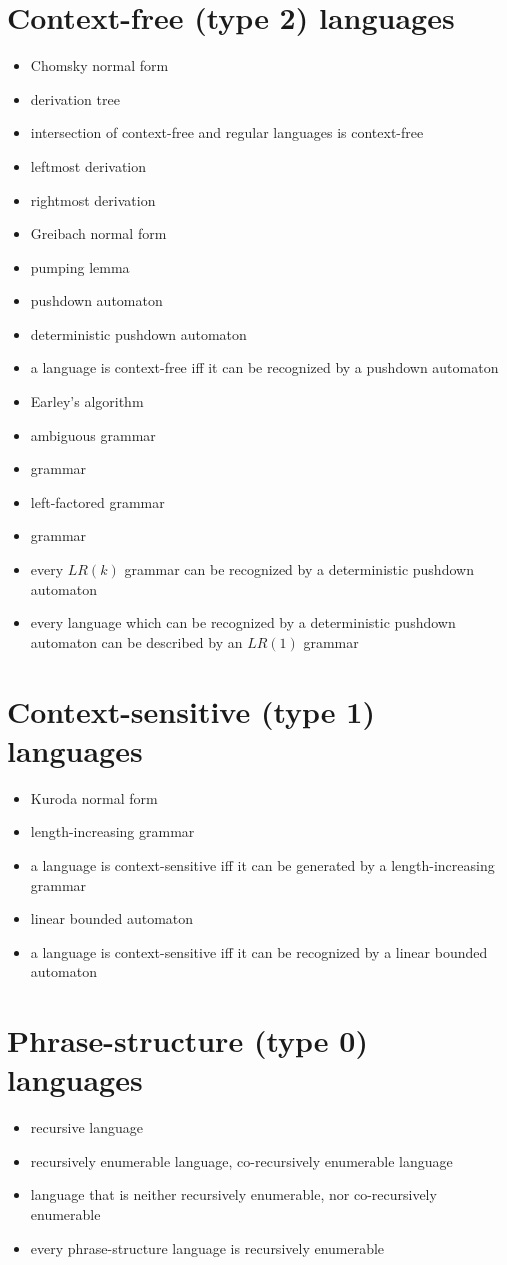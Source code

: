 \documentclass[12pt]{article}
\begin{document}
\section{Context-free (type 2) languages}
\begin{itemize}
\item Chomsky normal form
\item derivation tree
\item intersection of context-free and regular languages is context-free
\item leftmost derivation
\item rightmost derivation
\item Greibach normal form
\item pumping lemma
\item pushdown automaton
\item deterministic pushdown automaton
\item a language is context-free iff it can be recognized by a pushdown automaton
\item Earley's algorithm
\item ambiguous grammar
\item {} grammar
\item left-factored grammar
\item {} grammar
\item every $LR(k)$ grammar can be recognized by a deterministic pushdown 
automaton 
\item every language which can be recognized by a deterministic pushdown 
automaton can be described by an $LR(1)$ grammar
\end{itemize}

\section{Context-sensitive (type 1) languages}
\begin{itemize}
\item Kuroda normal form
\item length-increasing grammar
\item a language is context-sensitive iff it can be generated by a length-increasing grammar
\item linear bounded automaton
\item a language is context-sensitive iff it can be recognized by a linear bounded automaton
\end{itemize}

\section{Phrase-structure (type 0) languages}
\begin{itemize}
\item recursive language
\item recursively enumerable language, co-recursively enumerable language
\item language that is neither recursively enumerable, nor co-recursively enumerable
\item every phrase-structure language is recursively enumerable
\end{itemize}
\end{document}
